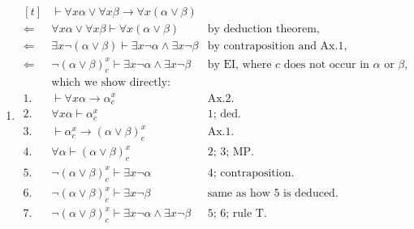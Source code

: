\begin{enumerate}[label=(\alph*)]
  \item $\begin{aligned}[t]
                       & \vdash\forall x \alpha\vee\forall x \beta\to\forall x(\alpha\vee \beta)                                                                              \\
            \Leftarrow & \forall x \alpha\vee \forall x \beta\vdash\forall x(\alpha\vee \beta)               & \text{by deduction theorem,}                                   \\
            \Leftarrow & \exists x\neg(\alpha\vee \beta)\vdash\exists x \neg \alpha\wedge\exists x\neg \beta & \text{by contraposition and Ax.1,}                             \\
            \Leftarrow & \neg(\alpha\vee \beta)_c^x\vdash\exists x \neg \alpha\wedge\exists x\neg \beta      & \text{by EI, where $c$ does not occur in $\alpha$ or $\beta$,} \\
                       & \text{which we show directly:}                                                                                                                       \\
            1.         & \vdash\forall x \alpha\to \alpha_c^x                                                & \text{Ax.2.}                                                   \\
            2.         & \forall x \alpha\vdash \alpha_c^x                                                   & \text{1; ded.}                                                 \\
            3.         & \vdash\alpha_c^x\to (\alpha\vee \beta)_c^x                                          & \text{Ax.1.}                                                   \\
            4.         & \forall \alpha\vdash(\alpha\vee \beta)_c^x                                          & \text{2; 3; MP.}                                               \\
            5.         & \neg(\alpha\vee \beta)_c^x\vdash\exists x\neg \alpha                                & \text{4; contraposition.}                                      \\
            6.         & \neg(\alpha\vee \beta)_c^x\vdash\exists x\neg \beta                                 & \text{same as how 5 is deduced.}                               \\
            7.         & \neg(\alpha\vee \beta)_c^x\vdash\exists x \neg \alpha\wedge\exists x\neg \beta      & \text{5; 6; rule T.}                                           \\
          \end{aligned}$
\end{enumerate}






